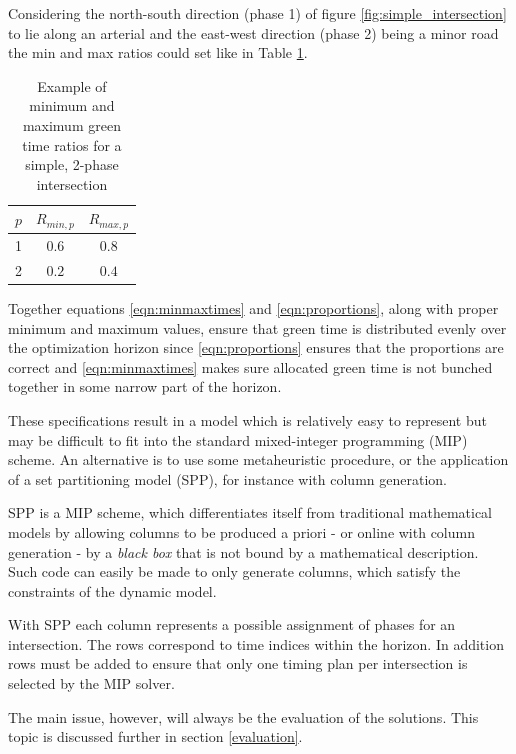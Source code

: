 Considering the north-south direction (phase 1) of figure \ref{fig:simple_intersection} to lie along an arterial and the east-west direction (phase 2) being a minor road the min and max ratios could set like in Table \ref{tbl:minmaxratios}.

\begin{table}[!ht]
\begin{center}
\begin{tabular}{c|c|c}
$p$ & $R_{min,p}$ & $R_{max,p}$ \\ \hline
1 & $0.6$ & $0.8$ \\ 
2 & $0.2$ & $0.4$
\end{tabular}
\end{center}
\caption{Example of minimum and maximum green time ratios for a simple, 2-phase intersection}
\label{tbl:minmaxratios}
\end{table}

Together equations \ref{eqn:minmaxtimes} and \ref{eqn:proportions}, along with proper minimum and maximum values, ensure that green time is distributed evenly over the optimization horizon since \ref{eqn:proportions} ensures that the proportions are correct and \ref{eqn:minmaxtimes} makes sure allocated green time is not bunched together in some narrow part of the horizon.

These specifications result in a model which is relatively easy to represent but may be difficult to fit into the standard mixed-integer programming (MIP) scheme. An alternative is to use some metaheuristic procedure, or the application of a set partitioning model (SPP), for instance with column generation.

SPP is a MIP scheme, which differentiates itself from traditional mathematical models by allowing columns to be produced a priori - or online with column generation - by a \textit{black box} that is not bound by a mathematical description. Such code can easily be made to only generate columns, which satisfy the constraints of the dynamic model.

With SPP each column represents a possible assignment of phases for an intersection. The rows correspond to time indices within the horizon. In addition rows must be added to ensure that only one timing plan per intersection is selected by the MIP solver.

The main issue, however, will always be the evaluation of the solutions. This topic is discussed further in section \ref{evaluation}.